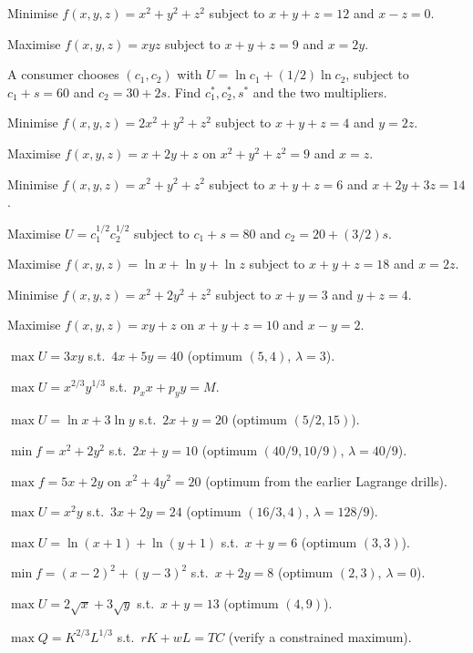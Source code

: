 \begin{problems}
  \item Minimise $f(x, y, z) = x^2 + y^2 + z^2$ subject to
        $x + y + z = 12$ and $x - z = 0$.
  \item Maximise $f(x, y, z) = x y z$ subject to $x + y + z = 9$ and
        $x = 2 y$.
  \item A consumer chooses $(c_1, c_2)$ with
        $U = \ln c_1 + (1/2) \ln c_2$, subject to $c_1 + s = 60$ and
        $c_2 = 30 + 2 s$. Find $c_1^*, c_2^*, s^*$ and the two
        multipliers.
  \item Minimise $f(x, y, z) = 2 x^2 + y^2 + z^2$ subject to
        $x + y + z = 4$ and $y = 2 z$.
  \item Maximise $f(x, y, z) = x + 2 y + z$ on $x^2 + y^2 + z^2 = 9$ and
        $x = z$.
  \item Minimise $f(x, y, z) = x^2 + y^2 + z^2$ subject to
        $x + y + z = 6$ and $x + 2 y + 3 z = 14$.
  \item Maximise $U = c_1^{1/2} c_2^{1/2}$ subject to $c_1 + s = 80$ and
        $c_2 = 20 + (3/2) s$.
  \item Maximise $f(x, y, z) = \ln x + \ln y + \ln z$ subject to
        $x + y + z = 18$ and $x = 2 z$.
  \item Minimise $f(x, y, z) = x^2 + 2 y^2 + z^2$ subject to $x + y = 3$
        and $y + z = 4$.
  \item Maximise $f(x, y, z) = x y + z$ on $x + y + z = 10$ and
        $x - y = 2$.
  \item $\max U = 3 x y$ s.t.\ $4 x + 5 y = 40$ (optimum $(5, 4)$,
        $\lambda = 3$).
  \item $\max U = x^{2/3} y^{1/3}$ s.t.\ $p_x x + p_y y = M$.
  \item $\max U = \ln x + 3 \ln y$ s.t.\ $2 x + y = 20$ (optimum
        $(5/2, 15)$).
  \item $\min f = x^2 + 2 y^2$ s.t.\ $2 x + y = 10$ (optimum
        $(40/9, 10/9)$, $\lambda = 40/9$).
  \item $\max f = 5 x + 2 y$ on $x^2 + 4 y^2 = 20$ (optimum from the
        earlier Lagrange drills).
  \item $\max U = x^2 y$ s.t.\ $3 x + 2 y = 24$ (optimum $(16/3, 4)$,
        $\lambda = 128/9$).
  \item $\max U = \ln(x + 1) + \ln(y + 1)$ s.t.\ $x + y = 6$ (optimum
        $(3, 3)$).
  \item $\min f = (x - 2)^2 + (y - 3)^2$ s.t.\ $x + 2 y = 8$ (optimum
        $(2, 3)$, $\lambda = 0$).
  \item $\max U = 2 \sqrt{x} + 3 \sqrt{y}$ s.t.\ $x + y = 13$ (optimum
        $(4, 9)$).
  \item $\max Q = K^{2/3} L^{1/3}$ s.t.\ $r K + w L = TC$ (verify a
        constrained maximum).


\end{problems}
